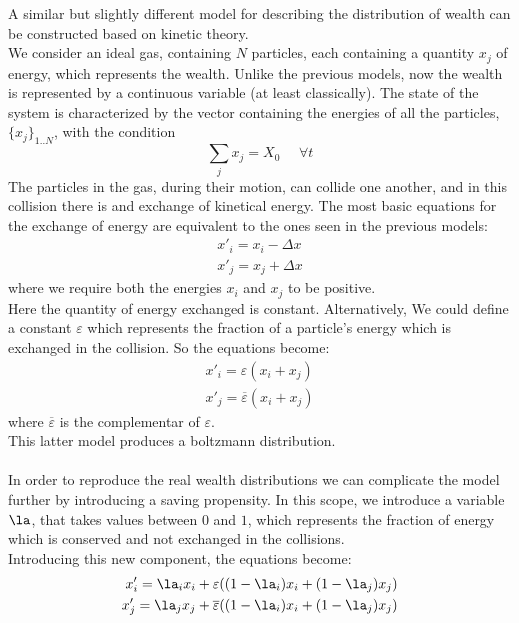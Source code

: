 A similar but slightly different model for describing the distribution of wealth can be constructed based on kinetic theory. \\
We consider an ideal gas, containing $N$ particles, each containing a quantity $x_j$ of energy, which represents the wealth. Unlike the previous models, now the wealth is represented by a continuous variable (at least classically). The state of the system is characterized by the vector containing the energies of all the particles, $\{x_j\}_{1..N}$, with the condition 
\begin{equation}
	\sum_j x_j = X_0 \ \ \ \ \ \ \forall t	
\end{equation}
The particles in the gas, during their motion, can collide one another, and in this collision there is and exchange of kinetical energy. The most basic equations for the exchange of energy are equivalent to the ones seen in the previous models:
\begin{equation}
	\begin{split}
		x'_i = x_i - \Delta x \\
		x'_j = x_j + \Delta x 
	\end{split}
\end{equation}
where we require both the energies $x_i$ and $x_j$ to be positive. \\
Here the quantity of energy exchanged is constant. Alternatively, We could define a constant $\varepsilon$ which represents the fraction of a particle's energy which is exchanged in the collision. So the equations become:
\begin{equation}
	\begin{split}
		x'_i = \varepsilon(x_i + x_j)	 \\
		x'_j = \overline{\varepsilon}(x_i + x_j)
	\end{split}
\end{equation}
where $\overline{\varepsilon}$ is the complementar of $\varepsilon$. \\
This latter model produces a boltzmann distribution. \\ \\
In order to reproduce the real wealth distributions we can complicate the model further by introducing a saving propensity. In this scope, we introduce a variable $\la$, that takes values between $0$ and $1$, which represents the fraction of energy which is conserved and not exchanged in the collisions. \\
Introducing this new component, the equations become:
\begin{equation}
	\begin{split}
		x'_i = \la_ix_i + \varepsilon((1-\la_i)x_i + (1-\la_j)x_j) 	\\
		x'_j = \la_jx_j + \overline{\varepsilon}((1-\la_i)x_i + (1-\la_j)x_j) 	\\
	\end{split}
\end{equation}
